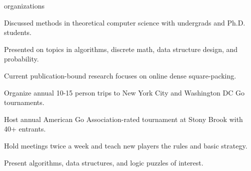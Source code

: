 \documentclass{cv}
\begin{document}
\begin{cvsection}{organizations}
  {
    \item Discussed methods in theoretical computer science with undergrads and Ph.D. students.
    \item Presented on topics in algorithms, discrete math, data structure design, and probability.
    \item Current publication-bound research focuses on online dense square-packing.
  }
  {
    \item Organize annual 10-15 person trips to New York City and Washington DC Go tournaments.
    \item Host annual American Go Association-rated tournament at Stony Brook with 40+ entrants.
    \item Hold meetings twice a week and teach new players the rules and basic strategy.
  }
  {
    \item Present algorithms, data structures, and logic puzzles of interest.
  } 
\end{cvsection}
\end{document}
